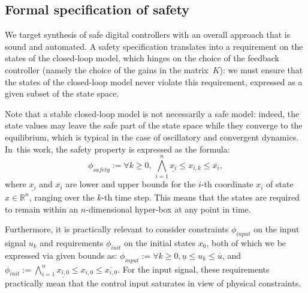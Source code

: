 \ifx\safetyrep
\subsection{Formal specification of safety} 
\label{ssec:safespecification}

We target synthesis of safe digital controllers with an overall approach that is sound and automated.
A safety specification translates into a requirement on the states of the closed-loop model, 
which hinges on the choice of the feedback controller (namely the choice of the gains in the matrix~$K$):  
we must ensure that the states of the closed-loop model never violate this requirement, expressed as a given subset of the state space.  

Note that a stable closed-loop model is not necessarily a safe model: 
indeed, the state values may leave the safe part of the state space while they converge
to the equilibrium, which is typical in the case of oscillatory and convergent dynamics. 
In~this work, the safety property is expressed as the formula:
%
\begin{equation}
\label{eq:safetyliteral}
\phi_\mathit{safety} := \forall k\ge 0,\, \bigwedge_{i=1}^{n}{\underline{x_{i}} \leq x_{i,k} \leq \overline{x_{i}}},
\end{equation}
%
%
where $\underline{x_{i}}$ and $\overline{x_{i}}$ are lower and upper bounds
for the $i$-th coordinate $x_{i}$ of state $x\in \mathbb R^n$, ranging over the $k$-th time step.  
This means that the states are required to remain within an $n$-dimensional hyper-box at any point in time.  	

Furthermore, it is practically relevant to consider constraints $\phi_\mathit{input}$ on the input
signal $u_{k}$ and requirements $\phi_\mathit{init}$ on the initial states $x_0$, 
both of which we be expressed via given bounds as: 
$\phi_\mathit{input} := {\forall k\ge 0, \underline{u} \leq u_{k} \leq \overline{u}} $, 
and $\phi_\mathit{init} := \bigwedge_{i=1}^{n} \underline{x_{i,0}} \leq x_{i,0} \leq \overline{x_{i,0}}$. 
For the input signal, these requirements practically mean that the control input saturates in view of physical constraints. 
\fi

